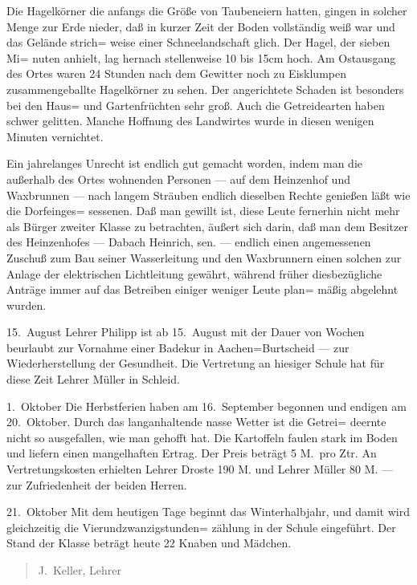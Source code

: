 

Die Hagelkörner die anfangs die Größe von Taubeneiern\ob
hatten, gingen in solcher Menge zur Erde nieder, daß in kurzer\ob
Zeit der Boden vollständig weiß war und das Gelände strich=\ob
weise einer Schneelandschaft glich. Der Hagel, der sieben Mi=\ob
nuten anhielt, lag hernach stellenweise 10 bis 15cm hoch. Am\ob
Ostausgang des Ortes waren 24 Stunden nach dem Gewitter\ob
noch zu Eisklumpen zusammengeballte Hagelkörner zu\ob
sehen. Der angerichtete Schaden ist besonders bei den Haus=\ob
und Gartenfrüchten sehr groß. Auch die Getreidearten haben\ob
schwer gelitten. Manche Hoffnung des Landwirtes wurde\ob
in diesen wenigen Minuten vernichtet.

Ein jahrelanges Unrecht ist endlich gut gemacht worden,\ob
indem man die außerhalb des Ortes wohnenden Personen — auf\ob
dem Heinzenhof und Waxbrunnen — nach langem Sträuben\ob
endlich dieselben Rechte genießen läßt wie die Dorfeinges=\ob
sessenen. Daß man gewillt ist, diese Leute fernerhin nicht\ob
mehr als Bürger zweiter Klasse zu betrachten, äußert sich\ob
darin, daß man dem Besitzer des Heinzenhofes — Dabach\ob
Heinrich, sen. — endlich einen angemessenen Zuschuß zum\ob
Bau seiner Wasserleitung und den Waxbrunnern\ob
einen solchen zur Anlage der elektrischen Lichtleitung\ob
gewährt, während früher diesbezügliche Anträge immer\ob
auf das Betreiben einiger weniger Leute plan=\ob
mäßig abgelehnt wurden.

15.\ August   Lehrer Philipp ist ab 15.\ August mit der Dauer von Wochen beurlaubt zur Vornahme einer Badekur in\ob
Aachen=Burtscheid — zur Wiederherstellung der Gesundheit.\ob
Die Vertretung an hiesiger Schule hat für diese Zeit\ob
Lehrer Müller in Schleid.

1.\ Oktober   Die Herbstferien haben am 16.\ September begonnen\ob
und endigen am 20.\ Oktober.\ob
Durch das langanhaltende nasse Wetter ist die Getrei=\ob
deernte nicht so ausgefallen, wie man gehofft hat. Die\ob
Kartoffeln faulen stark im Boden und liefern\ob
einen mangelhaften Ertrag. Der Preis beträgt 5 M.\ pro Ztr.\ob
An Vertretungskosten erhielten Lehrer Droste 190 M.\ob
und Lehrer Müller 80 M. — zur Zufriedenheit der beiden\ob
Herren.

21.\ Oktober  Mit dem heutigen Tage beginnt das Winterhalbjahr,\ob
und damit wird gleichzeitig die Vierundzwanzigstunden=\ob
zählung in der Schule eingeführt.\ob
Der Stand der Klasse beträgt heute 22 Knaben und Mädchen.

\pend
{}
\pstart


\pend
\begin{verse}
J.\ Keller, Lehrer
\end{verse}
\pstart
\pend
